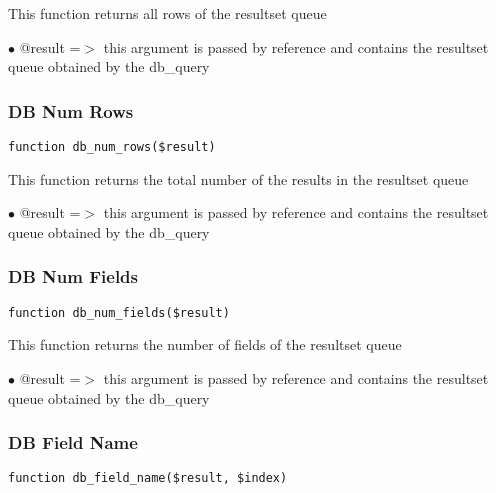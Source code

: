 \documentclass[a4paper]{article}
\begin{document}
This function returns all rows of the resultset queue

\begin{compactitem}
\item[\color{myblue}$\bullet$] @result =$>$ this argument is passed by reference and contains the resultset queue
           obtained by the db\_query
\end{compactitem}

\hypertarget{toc91}{}
\subsubsection{DB Num Rows}

\begin{lstlisting}
function db_num_rows($result)
\end{lstlisting}

This function returns the total number of the results in the resultset queue

\begin{compactitem}
\item[\color{myblue}$\bullet$] @result =$>$ this argument is passed by reference and contains the resultset queue
           obtained by the db\_query
\end{compactitem}

\hypertarget{toc92}{}
\subsubsection{DB Num Fields}

\begin{lstlisting}
function db_num_fields($result)
\end{lstlisting}

This function returns the number of fields of the resultset queue

\begin{compactitem}
\item[\color{myblue}$\bullet$] @result =$>$ this argument is passed by reference and contains the resultset queue
           obtained by the db\_query
\end{compactitem}

\hypertarget{toc93}{}
\subsubsection{DB Field Name}

\begin{lstlisting}
function db_field_name($result, $index)
\end{lstlisting}
\end{document}
